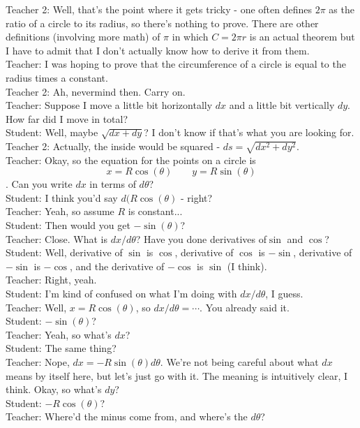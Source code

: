 Teacher 2: Well, that's the point where it gets tricky - one often defines $2\pi$ as the ratio of a circle to its radius, so there's nothing to prove.
There are other definitions (involving more math) of $\pi$ in which $C = 2\pi r$ is an actual theorem but I have to admit that I don't actually know how to derive it from them.\\
Teacher: I was hoping to prove that the circumference of a circle is equal to the radius times a constant.\\
Teacher 2: Ah, nevermind then. Carry on.\\
Teacher: Suppose I move a little bit horizontally $dx$ and a little bit vertically $dy$.
How far did I move in total?\\
Student: Well, maybe $\sqrt{dx + dy}$? I don't know if that's what you are looking for.\\
Teacher 2: Actually, the inside would be squared - $ds=\sqrt{dx^2+dy^2}$.\\
Teacher: Okay, so the equation for the points on a circle is $$x = R \cos(\theta) \qquad y = R \sin(\theta)$$.
 Can you write $dx$ in terms of $d\theta$?\\
Student:  I think you'd say $d(R \cos(\theta)$ - right?\\
Teacher: Yeah, so assume $R$ is constant...\\
Student: Then would you get $-\sin(\theta)$?\\
Teacher: Close. What is $dx / d\theta$? Have you done derivatives of$\sin$ and $\cos$?
Student: Well, derivative of $\sin$ is $\cos$, derivative of $\cos$ is $-\sin$, derivative of $-\sin$ is $-\cos$, and the derivative of $-\cos$ is $\sin$ (I think).\\
Teacher: Right, yeah. \\
Student: I'm kind of confused on what I'm doing with $dx/d\theta$, I guess.\\
Teacher: Well, $x = R \cos(\theta)$, so $dx/d\theta = \cdots$. You already said it.\\
Student: $-\sin(\theta)$?\\
Teacher: Yeah, so what's $dx$?\\
Student: The same thing?\\
Teacher: Nope, $dx = - R \sin(\theta) d\theta$.
We're not being careful about what $dx$ means by itself here, but let's just go with it.
The meaning is intuitively clear, I think.
Okay, so what's $dy$?\\
Student: $-R\cos(\theta)$?\\
Teacher: Where'd the minus come from, and where's the $d\theta$?\\
